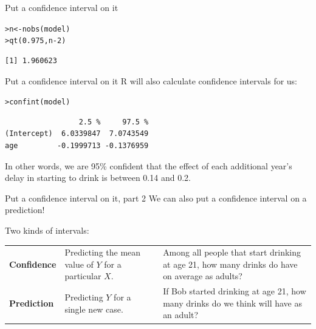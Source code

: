 \documentclass{beamer}\usepackage[]{graphicx}\usepackage[]{color}
\makeatletter
\newcommand{\hlnum}[1]{\textcolor[rgb]{0.824,0.412,0.118}{#1}}%
\newcommand{\hlopt}[1]{\textcolor[rgb]{1,0.894,0.769}{#1}}%
\newcommand{\hlstd}[1]{\textcolor[rgb]{1,0.894,0.769}{#1}}%
\newcommand{\hlkwb}[1]{\textcolor[rgb]{0.804,0.776,0.451}{#1}}%
\newcommand{\hlkwd}[1]{\textcolor[rgb]{1,0.78,0.769}{#1}}%
\newenvironment{kframe}{%
 \def\at@end@of@kframe{}%
 \ifinner\ifhmode%
  \def\at@end@of@kframe{\end{minipage}}%
  \begin{minipage}{\columnwidth}%
 \fi\fi%
 \def\FrameCommand##1{\hskip\@totalleftmargin \hskip-\fboxsep
 \colorbox{shadecolor}{##1}\hskip-\fboxsep
     \hskip-\linewidth \hskip-\@totalleftmargin \hskip\columnwidth}%
 \MakeFramed {\advance\hsize-\width
   \@totalleftmargin\z@ \linewidth\hsize
   \@setminipage}}%
 {\par\unskip\endMakeFramed%
 \at@end@of@kframe}
\newenvironment{knitrout}{}{} %
\makeatother
\begin{document}
\begin{darkframes}
\begin{frame}[fragile]{Put a confidence interval on it}
\begin{knitrout}
\begin{kframe}
\begin{alltt}
\hlstd{> }\hlstd{n} \hlkwb{<-} \hlkwd{nobs}\hlstd{(model)}
\hlstd{> }\hlkwd{qt}\hlstd{(}\hlnum{0.975}\hlstd{, n}\hlopt{-}\hlnum{2}\hlstd{)}
\end{alltt}
\begin{verbatim}
[1] 1.960623
\end{verbatim}
\end{kframe}
\end{knitrout}
    \end{frame}

    \begin{frame}[fragile]{Put a confidence interval on it}
      R will also calculate confidence intervals for us:
\begin{knitrout}
\begin{kframe}
\begin{alltt}
\hlstd{> }\hlkwd{confint}\hlstd{(model)}
\end{alltt}
\begin{verbatim}
                 2.5 %     97.5 %
(Intercept)  6.0339847  7.0743549
age         -0.1999713 -0.1376959
\end{verbatim}
\end{kframe}
\end{knitrout}

      \pause
      In other words, we are 95\% confident that the effect of each additional year's delay in starting to drink is between 0.14 and 0.2.
    \end{frame}

    \begin{frame}{Put a confidence interval on it, part 2}
      We can also put a confidence interval on a prediction!  

      Two kinds of intervals:
      \bigskip

      \begin{tabular}{lp{1in}p{2in}}
        \textbf{Confidence} & Predicting the mean value of $Y$ for a particular $X$. & Among all people that start drinking at age 21, how many drinks do have on average as adults? \\
        \textbf{Prediction} & Predicting $Y$ for a single new case. & If Bob started drinking at age 21, how many drinks do we think will have as an adult? \\
      \end{tabular}
    \end{frame}


\end{darkframes}
\end{document}
